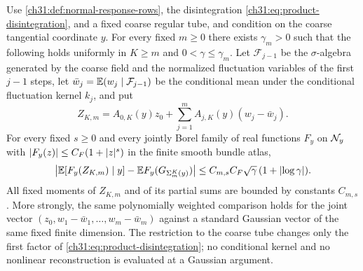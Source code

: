 \begin{lemma}\label{ch31:lem:weighted-prefix-gaussian}
Use \cref{ch31:def:normal-response-rows}, the disintegration \eqref{ch31:eq:product-disintegration}, and a fixed coarse regular tube, and condition on the coarse tangential coordinate $y$. For every fixed $m\ge0$ there exists $\gamma_m>0$ such that the following holds uniformly in $K\ge m$ and $0<\gamma\le\gamma_m$. Let $\mathcal F_{j-1}$ be the $\sigma$-algebra generated by the coarse field and the normalized fluctuation variables of the first $j-1$ steps, let $\bar w_j=\mathbb E(w_j\mid\mathcal F_{j-1})$ be the conditional mean under the conditional fluctuation kernel $k_j$, and put
\[
 Z_{K,m}=A_{0,K}(y)z_0+\sum_{j=1}^mA_{j,K}(y)(w_j-\bar w_j).
\]
For every fixed $s\ge0$ and every jointly Borel family of real functions $F_y$ on $\mathcal N_{y}$ with $\lvert F_y(z)\rvert\le C_F(1+\lvert z\rvert^s)$ in the finite smooth bundle atlas,
\[
 \bigl\lvert\mathbb E[F_y(Z_{K,m})\mid y]-\mathbb E F_y(G_{\Sigma_m^K(y)})\bigr\rvert\le C_{m,s}C_F\sqrt\gamma\,(1+\lvert \log\gamma\rvert).
\]
All fixed moments of $Z_{K,m}$ and of its partial sums are bounded by constants $C_{m,s}$. More strongly, the same polynomially weighted comparison holds for the joint vector $(z_0,w_1-\bar w_1,\dots,w_m-\bar w_m)$ against a standard Gaussian vector of the same fixed finite dimension. The restriction to the coarse tube changes only the first factor of \eqref{ch31:eq:product-disintegration}; no conditional kernel and no nonlinear reconstruction is evaluated at a Gaussian argument.
\end{lemma}

